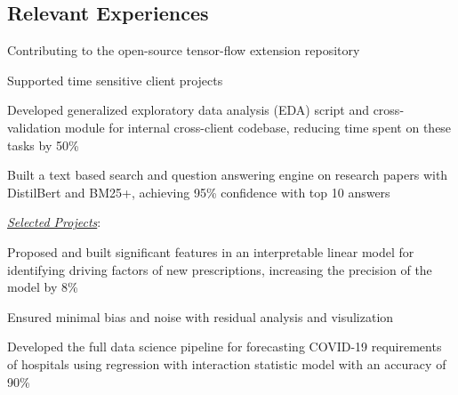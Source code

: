 \documentclass{mxresume}
\begin{document}
%
\begin{minipage}[t]{0.72\textwidth}
\begin{resumebody}
\begin{large}

\section*{Relevant Experiences}
%
\begin{tightemize}{5mm}
\item Contributing to the open-source tensor-flow extension repository
\end{tightemize}
%
%
\begin{tightemize}{5mm}
\item Supported time sensitive client projects
\item Developed generalized exploratory data analysis (EDA) script and cross-validation module for internal cross-client codebase, reducing time spent on these tasks by 50\textsc{\%}
\item Built a text based search and question answering engine on research papers with DistilBert and BM25+, achieving 95\textsc{\%} confidence with top 10 answers
\end{tightemize}
\sectionenumPad
\emph{\underline{Selected Projects}}: \\[1.5mm]
\begin{tightemize}{5mm}
\item Proposed and built significant features in an interpretable linear model for identifying driving factors of new prescriptions, increasing the precision of the model by 8\textsc{\%}
\item Ensured minimal bias and noise with residual analysis and visulization 
\end{tightemize}
\sectionenumPad
{}
\begin{tightemize}{5mm}
\item Developed the full data science pipeline for forecasting COVID-19 requirements of hospitals using regression with interaction statistic model with an accuracy of 90\textsc{\%}

\end{tightemize}
\end{large}
\end{resumebody}
\end{minipage}
\end{document}
